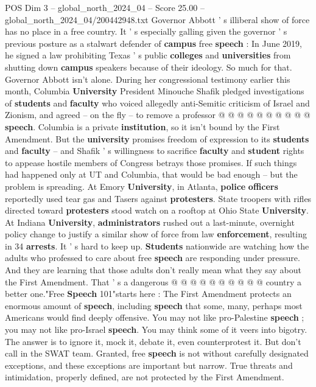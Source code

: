 \begin{textsample}{POS Dim 3 – global\_north\_2024\_04 – Score 25.00 – global\_north\_2024\_04/200442948.txt}
Governor Abbott ' s illiberal show of force has no place in a free country.
It ' s especially galling given the governor ' s previous posture as a stalwart defender of \textbf{campus} free \textbf{speech} : In June 2019, he signed a law prohibiting Texas ' s public \textbf{colleges} and \textbf{universities} from shutting down \textbf{campus} speakers because of their ideology.
So much for that.
Governor Abbott isn't alone.
During her congressional testimony earlier this month, Columbia \textbf{University} President Minouche Shafik pledged investigations of \textbf{students} and \textbf{faculty} who voiced allegedly anti-Semitic criticism of Israel and Zionism, and agreed -- on the fly -- to remove a professor @ @ @ @ @ @ @ @ @ @ \textbf{speech}.
Columbia is a private \textbf{institution}, so it isn't bound by the First Amendment.
But the \textbf{university} promises freedom of expression to its \textbf{students} and \textbf{faculty} -- and Shafik ' s willingness to sacrifice \textbf{faculty} and \textbf{student} rights to appease hostile members of Congress betrays those promises.
If such things had happened only at UT and Columbia, that would be bad enough -- but the problem is spreading.
At Emory \textbf{University}, in Atlanta, \textbf{police} \textbf{officers} reportedly used tear gas and Tasers against \textbf{protesters}.
State troopers with rifles directed toward \textbf{protesters} stood watch on a rooftop at Ohio State \textbf{University}.
At Indiana \textbf{University}, \textbf{administrators} rushed out a last-minute, overnight policy change to justify a similar show of force from law \textbf{enforcement}, resulting in 34 \textbf{arrests}.
It ' s hard to keep up. \textbf{Students} nationwide are watching how the adults who professed to care about free \textbf{speech} are responding under pressure.
And they are learning that those adults don't really mean what they say about the First Amendment.
That ' s a dangerous @ @ @ @ @ @ @ @ @ @ country a better one."Free \textbf{Speech} 101"starts here : The First Amendment protects an enormous amount of \textbf{speech}, including \textbf{speech} that some, many, perhaps most Americans would find deeply offensive.
You may not like pro-Palestine \textbf{speech} ; you may not like pro-Israel \textbf{speech}.
You may think some of it veers into bigotry.
The answer is to ignore it, mock it, debate it, even counterprotest it.
But don't call in the SWAT team.
Granted, free \textbf{speech} is not without carefully designated exceptions, and these exceptions are important but narrow.
True threats and intimidation, properly defined, are not protected by the First Amendment.

\end{textsample}
